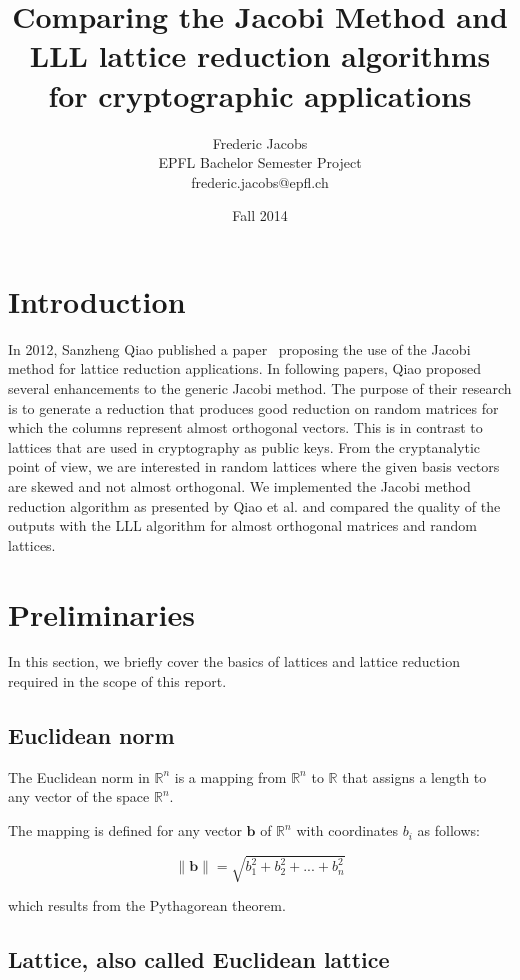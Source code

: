 \documentclass[10pt, a4paper]{article}
\title{Comparing the Jacobi Method and LLL lattice reduction algorithms for cryptographic applications}
\date{Fall 2014}
\author{Frederic Jacobs\\ EPFL Bachelor Semester Project\\ frederic.jacobs@epfl.ch}
\renewcommand{\vec}[1]{\mathbf{#1}}
\begin{document}
\maketitle

\section{Introduction}
In 2012, Sanzheng Qiao published a paper~\cite{originalJacobiMethodLatticeBasisReduction} proposing the use of the Jacobi method for lattice reduction applications. In following papers, Qiao proposed several enhancements to the generic Jacobi method. The purpose of their research is to generate a reduction that produces good reduction on random matrices for which the columns represent almost orthogonal vectors. This is in contrast to lattices that are used in cryptography as public keys. From the cryptanalytic point of view, we are interested in random lattices where the given basis vectors are skewed and not almost orthogonal. We implemented the Jacobi method reduction algorithm as presented by Qiao et al. and compared the quality of the outputs with the LLL algorithm for almost orthogonal matrices and random lattices.
 
\section{Preliminaries}

In this section, we briefly cover the basics of lattices and lattice reduction required in the scope of this report.

\subsection{Euclidean norm}

The Euclidean norm in $\mathbb{R}^n$ is a mapping from $\mathbb{R}^n $ to $\mathbb{R}$ that assigns a length to any vector of the space $\mathbb{R}^n$.

The mapping is defined for any vector $\vec{b}$ of $\mathbb{R}^n$ with coordinates $b_i$ as follows: 

\[
\|\mathbf{b}\| = \sqrt{b_1^2 + b_2^2 + ... + b_n^2} 
\] 

which results from the Pythagorean theorem.

\subsection{Lattice, also called Euclidean lattice}
\end{document}
